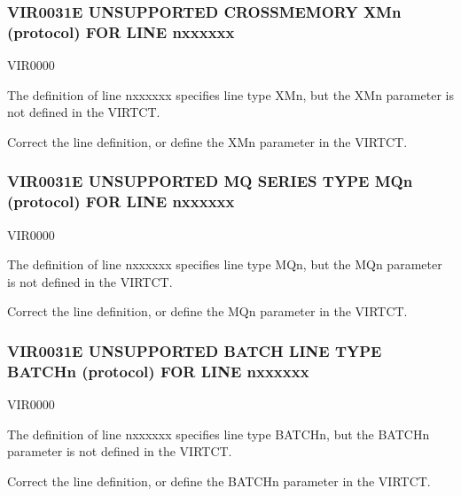 \documentclass[letterpaper,10pt,english]{sphinxmanual}
\begin{document}
\subsubsection{VIR0031E UNSUPPORTED CROSS\sphinxhyphen{}MEMORY XMn (protocol) FOR LINE n\sphinxhyphen{}xxxxxx}
\label{\detokenize{messages:vir0031e-unsupported-cross-memory-xmn-protocol-for-line-n-xxxxxx}}\begin{description}
\sphinxAtStartPar
VIR0000

\sphinxAtStartPar
The definition of line n\sphinxhyphen{}xxxxxx specifies line type XMn, but the XMn parameter is not defined in the VIRTCT.

\sphinxAtStartPar
Correct the line definition, or define the XMn parameter in the VIRTCT.

\end{description}


\subsubsection{VIR0031E UNSUPPORTED MQ SERIES TYPE MQn (protocol) FOR LINE n\sphinxhyphen{}xxxxxx}
\label{\detokenize{messages:vir0031e-unsupported-mq-series-type-mqn-protocol-for-line-n-xxxxxx}}\begin{description}
\sphinxAtStartPar
VIR0000

\sphinxAtStartPar
The definition of line n\sphinxhyphen{}xxxxxx specifies line type MQn, but the MQn parameter is not defined in the VIRTCT.

\sphinxAtStartPar
Correct the line definition, or define the MQn parameter in the VIRTCT.

\end{description}


\subsubsection{VIR0031E UNSUPPORTED BATCH LINE TYPE BATCHn (protocol) FOR LINE n\sphinxhyphen{}xxxxxx}
\label{\detokenize{messages:vir0031e-unsupported-batch-line-type-batchn-protocol-for-line-n-xxxxxx}}\begin{description}
\sphinxAtStartPar
VIR0000

\sphinxAtStartPar
The definition of line n\sphinxhyphen{}xxxxxx specifies line type BATCHn, but the BATCHn parameter is not defined in the VIRTCT.

\sphinxAtStartPar
Correct the line definition, or define the BATCHn parameter in the VIRTCT.

\end{description}
\end{document}
